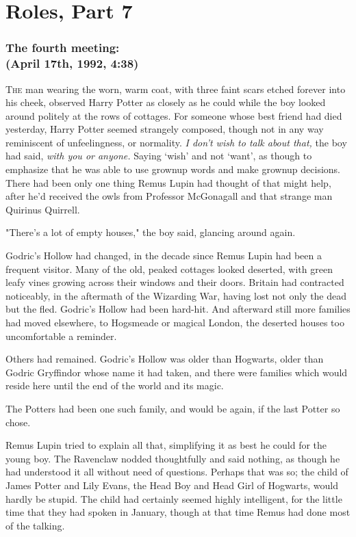 \chapter{Roles, Part 7}

\subsection{The fourth meeting:\\
(April 17th, 1992, 4:38\PM)}

\lettrine{T}{he} man wearing the worn, warm coat, with three faint scars etched forever into
his cheek, observed Harry Potter as closely as he could while the boy looked
around politely at the rows of cottages. For someone whose best friend had died
yesterday, Harry Potter seemed strangely composed, though not in any way
reminiscent of unfeelingness, or normality. \emph{I don't wish to talk about
that,} the boy had said, \emph{with you or anyone.} Saying `wish' and not
`want', as though to emphasize that he was able to use grownup words and make
grownup decisions. There had been only one thing Remus Lupin had thought of
that might help, after he'd received the owls from Professor McGonagall and
that strange man Quirinus Quirrell.

"There's a lot of empty houses," the boy said, glancing around again.

Godric's Hollow had changed, in the decade since Remus Lupin had been a
frequent visitor. Many of the old, peaked cottages looked deserted, with green
leafy vines growing across their windows and their doors. Britain had
contracted noticeably, in the aftermath of the Wizarding War, having lost not
only the dead but the fled. Godric's Hollow had been hard-hit. And afterward
still more families had moved elsewhere, to Hogsmeade or magical London, the
deserted houses too uncomfortable a reminder.

Others had remained. Godric's Hollow was older than Hogwarts, older than Godric
Gryffindor whose name it had taken, and there were families which would reside
here until the end of the world and its magic.

The Potters had been one such family, and would be again, if the last Potter so
chose.

Remus Lupin tried to explain all that, simplifying it as best he could for the
young boy. The Ravenclaw nodded thoughtfully and said nothing, as though he had
understood it all without need of questions. Perhaps that was so; the child of
James Potter and Lily Evans, the Head Boy and Head Girl of Hogwarts, would
hardly be stupid. The child had certainly seemed highly intelligent, for the
little time that they had spoken in January, though at that time Remus had done
most of the talking.

